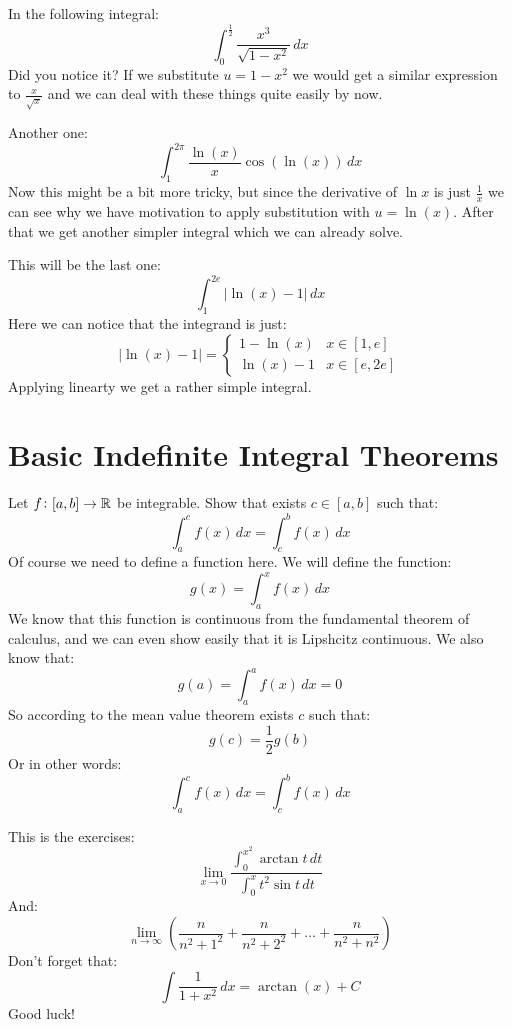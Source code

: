 \documentclass[11pt,a4paper]{article}
\begin{document}
	\newpage
	
	In the following integral:
	\[
		\int_{0}^{\frac 12}{\frac{x^3}{\sqrt{1-x^2}}\,dx}
	\]
	Did you notice it? If we substitute $u=1-x^2$ we would get a similar
	expression to $\frac{x}{\sqrt{x}}$ and we can deal with these things
	quite easily by now.
	
	\newpage
	
	Another one:
	\[
		\int_{1}^{2\pi}{\frac{\ln(x)}{x}\cos(\ln(x))\,dx}
	\]
	Now this might be a bit more tricky, but since the derivative of
	$\ln x$ is just $\frac{1}{x}$ we can see why we have motivation to apply
	substitution with $u = \ln(x)$. After that we get another simpler
	integral which we can already solve.
	
	\newpage
	
	This will be the last one:
	\[
		\int_{1}^{2e}{|\ln(x) - 1|\,dx}
	\]
	Here we can notice that the integrand is just:
	\[
		|\ln(x) - 1| = \begin{cases}
			1 - \ln(x) & x\in[1,e] \\
			\ln(x) - 1 & x\in[e,2e]
		\end{cases}
	\]
	Applying linearty we get a rather simple integral.
	
	\newpage
	
	\section{Basic Indefinite Integral Theorems}
	Let $f\colon [a,b]\to\mathbb{R}$ be integrable. Show that exists 
	$c\in [a,b]$ such that:
	\[
		\int_{a}^{c}{f(x)\,dx} = \int_{c}^{b}{f(x)\,dx}
	\]
	Of course we need to define a function here. We will define the
	function:
	\[
		g(x) = \int_{a}^{x}{f(x)\,dx}
	\]
	We know that this function is continuous from the fundamental theorem
	of calculus, and we can even show easily that it is Lipshcitz continuous.
	We also know that:
	\[
		g(a) = \int_{a}^{a}{f(x)\,dx} = 0
	\]
	So according to the mean value theorem exists $c$ such that:
	\[
		g(c) = \frac{1}{2}g(b)
	\]
	Or in other words:
	\[
		\int_{a}^{c}{f(x)\,dx} = \int_{c}^{b}{f(x)\,dx}
	\]
	
	\newpage
	
	This is the exercises:
	\[
		\lim_{x\to 0}{\frac{\int_{0}^{x^2}{\arctan t\,dt}}
		{\int_{0}^{x}{t^2\sin t\,dt}}}
	\]
	And:
	\[
		\lim_{n\to\infty}
		{\left(\frac{n}{n^2+1^2}+\frac{n}{n^2+2^2}+
		\dots+\frac{n}{n^2+n^2}\right)}	
	\]
	Don't forget that:
	\[
		\int{\frac{1}{1+x^2}\,dx} = \arctan(x) + C
	\]
	Good luck!
	
\end{document}

